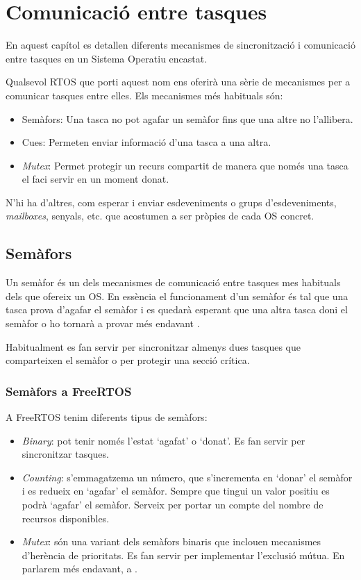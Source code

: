 
\chapter{Comunicació entre tasques}

En aquest capítol es detallen diferents mecanismes de sincronització i comunicació entre tasques en un Sistema Operatiu encastat.

Qualsevol RTOS que porti aquest nom ens oferirà una sèrie de mecanismes per a comunicar tasques entre elles. Els mecanismes més habituals són:
\begin{itemize}
 \item Semàfors: Una tasca no pot agafar un semàfor fins que una altre no l'allibera.
 \item Cues: Permeten enviar informació d'una tasca a una altra.
 \item {\em Mutex}: Permet protegir un recurs compartit de manera que només una tasca el faci servir en un moment donat.
\end{itemize}

N'hi ha d'altres, com esperar i enviar esdeveniments o grups d'esdeveniments, {\em mailboxes}, senyals, etc. que acostumen a ser pròpies de cada \gls{OS} concret.

\section{Semàfors}
Un semàfor és un dels mecanismes de comunicació entre tasques mes habituals dels que ofereix un OS. En essència el funcionament d'un semàfor és tal que una tasca prova d'agafar el semàfor i es quedarà esperant que una altra tasca doni el semàfor o ho tornarà a provar més endavant \cite[244]{EmbeddedDictionary} \cite[187]{programmingembedded}.

Habitualment es fan servir per sincronitzar almenys dues tasques que comparteixen el semàfor o per protegir una secció crítica.

\subsection{Semàfors a FreeRTOS}
A FreeRTOS tenim diferents tipus de semàfors:

\begin{itemize}
 \item {\em Binary}: pot tenir només l'estat ‘agafat' o ‘donat'. Es fan servir per sincronitzar tasques.
 \item {\em Counting}: s'emmagatzema un número, que s'incrementa en ‘donar' el semàfor i es redueix en ‘agafar' el semàfor. Sempre que tingui un valor positiu es podrà ‘agafar' el semàfor. Serveix per portar un compte del nombre de recursos disponibles.
 \item {\em Mutex}: són una variant dels semàfors binaris que inclouen mecanismes d'herència de prioritats. Es fan servir per implementar l'exclusió mútua. En parlarem més endavant, a .
\end{itemize}

